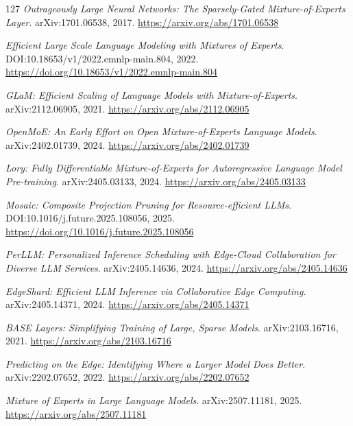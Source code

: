 \documentclass[11pt,a4paper]{article}
\begin{document}
\begin{thebibliography}{127}
\newblock \emph{Outrageously Large Neural Networks: The Sparsely-Gated Mixture-of-Experts Layer}.
\newblock arXiv:1701.06538, 2017.
\newblock \url{https://arxiv.org/abs/1701.06538}

\newblock \emph{Efficient Large Scale Language Modeling with Mixtures of Experts}.
\newblock DOI:10.18653/v1/2022.emnlp-main.804, 2022.
\newblock \url{https://doi.org/10.18653/v1/2022.emnlp-main.804}

\newblock \emph{GLaM: Efficient Scaling of Language Models with Mixture-of-Experts}.
\newblock arXiv:2112.06905, 2021.
\newblock \url{https://arxiv.org/abs/2112.06905}

\newblock \emph{OpenMoE: An Early Effort on Open Mixture-of-Experts Language Models}.
\newblock arXiv:2402.01739, 2024.
\newblock \url{https://arxiv.org/abs/2402.01739}

\newblock \emph{Lory: Fully Differentiable Mixture-of-Experts for Autoregressive Language Model Pre-training}.
\newblock arXiv:2405.03133, 2024.
\newblock \url{https://arxiv.org/abs/2405.03133}

\newblock \emph{Mosaic: Composite Projection Pruning for Resource-efficient LLMs}.
\newblock DOI:10.1016/j.future.2025.108056, 2025.
\newblock \url{https://doi.org/10.1016/j.future.2025.108056}

\newblock \emph{PerLLM: Personalized Inference Scheduling with Edge-Cloud Collaboration for Diverse LLM Services}.
\newblock arXiv:2405.14636, 2024.
\newblock \url{https://arxiv.org/abs/2405.14636}

\newblock \emph{EdgeShard: Efficient LLM Inference via Collaborative Edge Computing}.
\newblock arXiv:2405.14371, 2024.
\newblock \url{https://arxiv.org/abs/2405.14371}

\newblock \emph{BASE Layers: Simplifying Training of Large, Sparse Models}.
\newblock arXiv:2103.16716, 2021.
\newblock \url{https://arxiv.org/abs/2103.16716}

\newblock \emph{Predicting on the Edge: Identifying Where a Larger Model Does Better}.
\newblock arXiv:2202.07652, 2022.
\newblock \url{https://arxiv.org/abs/2202.07652}

\newblock \emph{Mixture of Experts in Large Language Models}.
\newblock arXiv:2507.11181, 2025.
\newblock \url{https://arxiv.org/abs/2507.11181}


\end{thebibliography}
\end{document}
